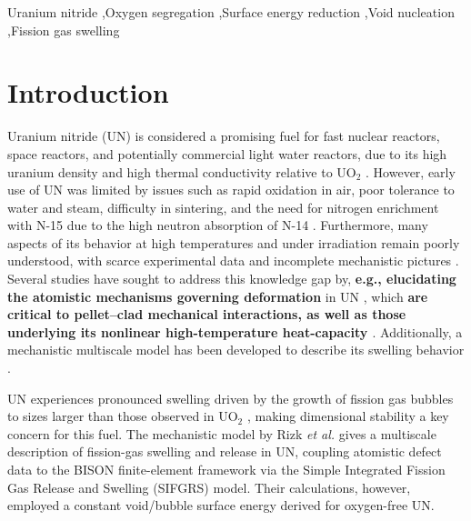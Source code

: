 \documentclass[preprint,12pt,sort&compress]{elsarticle}
\newcommand{\?}{\stackrel{?}{=}}
\providecommand{\DIFaddtex}[1]{{\bf #1}} %
\providecommand{\DIFdeltex}[1]{} %
\providecommand{\DIFaddbegin}{\protect\color{blue}} %
\providecommand{\DIFaddend}{\protect\color{black}} %
\providecommand{\DIFdelbegin}{\protect\color{red}} %
\providecommand{\DIFdelend}{\protect\color{black}} %
\providecommand{\DIFadd}[1]{\texorpdfstring{\DIFaddtex{#1}}{#1}} %
\providecommand{\DIFdel}[1]{\texorpdfstring{\DIFdeltex{#1}}{}} %
\begin{document}
\begin{frontmatter}
\begin{abstract}
\end{abstract}

\begin{keyword}
Uranium nitride \sep Oxygen segregation \sep Surface energy reduction \sep Void nucleation \sep Fission gas swelling
\end{keyword}

\end{frontmatter}

\newpage

\linenumbers

\section{Introduction}
\label{intro}

Uranium nitride (UN) is considered a promising fuel for fast nuclear reactors, space reactors, and potentially commercial light water reactors, due to its high uranium density and high thermal conductivity relative to UO$_2$ \cite{Wallenius2020, Uno2020}. However, early use of UN was limited by issues such as rapid oxidation in air, poor tolerance to water and steam, difficulty in sintering, and the need for nitrogen enrichment with N-15 due to the high neutron absorption of N-14 \cite{Wallenius2020, Uno2020}. Furthermore, many aspects of its behavior at high temperatures and under irradiation remain poorly understood, with scarce experimental data and incomplete mechanistic pictures \cite{Wallenius2020, Uno2020}. Several studies have sought to address this knowledge gap by, \DIFdelbegin \DIFdel{for instance, offering an atomistic-level understanding of the deformation mechanisms }\DIFdelend \DIFaddbegin \DIFadd{e.g., elucidating the atomistic mechanisms governing deformation }\DIFaddend in UN \cite{AbdulHameed2024b, AbdulHameed2025}, which \DIFdelbegin \DIFdel{play a critical role in pellet–clad mechanical interactions}\DIFdelend \DIFaddbegin \DIFadd{are critical to pellet--clad mechanical interactions, as well as those underlying its nonlinear high-temperature heat-capacity \cite{AbdulHameed2026}}\DIFaddend . Additionally, a mechanistic multiscale model has been developed to describe its swelling behavior \cite{Rizk2025}.

UN experiences pronounced swelling driven by the growth of fission gas bubbles to sizes larger than those observed in UO$_2$ \cite{Ronchi1975, Ronchi1978, Rizk2025}, making dimensional stability a key concern for this fuel. The mechanistic model by Rizk \textit{et al.} \cite{Rizk2025} gives a multiscale description of fission-gas swelling and release in UN, coupling atomistic defect data to the BISON finite-element framework via the Simple Integrated Fission Gas Release and Swelling (SIFGRS) model. Their calculations, however, employed a constant void/bubble surface energy derived for oxygen-free UN.
\end{document}
